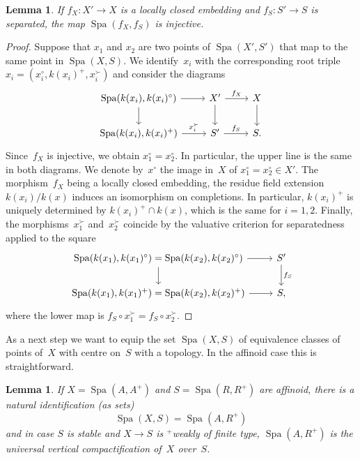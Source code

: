 \documentclass[a4paper,twoside,11pt,reqno]{amsart}
\DeclareMathOperator{\Spa}{Spa}
\newtheorem{lem}[thm]{Lemma}
\theoremstyle{definition}
\numberwithin{equation}{subsection}
\begin{document}
\begin{lem} \label{lem:Spa-injective}
    If $f_X \colon X' \to X$ is a locally closed embedding and $f_S \colon S' \to S$ is separated, the map $\Spa(f_X,f_S)$ is injective.
\end{lem}

\begin{proof}
    Suppose that $x_1$ and $x_2$ are two points of $\Spa(X',S')$ that map to the same point in $\Spa(X,S)$.
   We identify~$x_i$ with the corresponding root triple $x_i = (x_i^\circ,k(x_i)^+,x_i^\succ)$ and consider the diagrams
    \[
 \begin{tikzcd}
     \Spa(k(x_i),k(x_i)^\circ)    \ar[r]        \ar[d]  & X'    \ar[r,"f_X"]    \ar[d]  & X \ar[d]  \\
     \Spa(k(x_i),k(x_i)^+)        \ar[r,"x_i^\succ"]          & S'    \ar[r,"f_S"]            & S.
 \end{tikzcd}
\]
Since~$f_X$ is injective, we obtain $x_1^\circ = x_2^\circ$.
In particular, the upper line is the same in both diagrams.
We denote by~$x^\circ$ the image in~$X$ of $x_1^\circ = x_2^\circ \in X'$.
The morphism~$f_X$ being a locally closed embedding, the residue field extension $k(x_i)/k(x)$ induces an isomorphism on completions.
In particular, $k(x_i)^+$ is uniquely determined by $k(x_i)^+ \cap k(x)$, which is the same for $i=1,2$.
Finally, the morphisms~$x_1^\succ$ and~$x_2^\succ$ coincide by the valuative criterion for separatedness applied to the square
\[
    \begin{tikzcd}
        \Spa(k(x_1),k(x_1)^\circ) = \Spa(k(x_2),k(x_2)^\circ)   \ar[r]  \ar[d]  & S' \ar[d,"f_S"]    \\
        \Spa(k(x_1),k(x_1)^+) = \Spa(k(x_2),k(x_2)^+)           \ar[r]  & S,
    \end{tikzcd}
\]
where the lower map is $f_S \circ x_1^\succ = f_S \circ x_2^\succ$.
\end{proof}

As a next step we want to equip the set $\Spa(X,S)$ of equivalence classes of points of~$X$ with centre on~$S$ with a topology.
In the affinoid case this is straightforward.

\begin{lem} \label{lem:Spa-barX-affinoid}
    If $X = \Spa(A,A^+)$ and $S = \Spa(R,R^+)$ are affinoid, there is a natural identification (as sets)
    \[
    \Spa(X,S) = \Spa(A,R^+)
    \]
    and in case $S$ is stable and $X \to S$ is ${}^+$weakly of finite type, $\Spa(A,R^+)$ is the universal vertical compactification of~$X$ over~$S$.
\end{lem}
\end{document}
